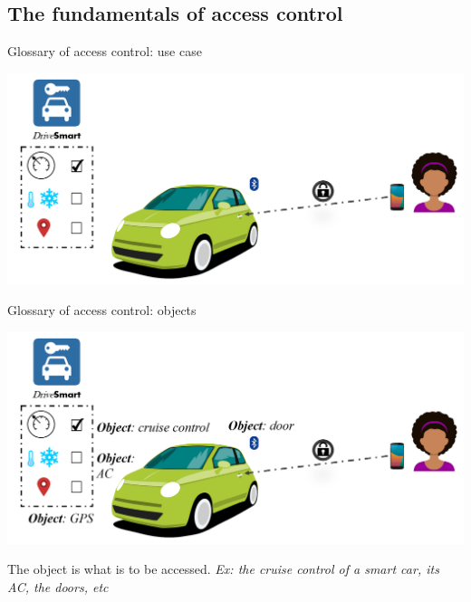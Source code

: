 \subsection{The fundamentals of access control}

\begin{frame}{Glossary of access control: use case}
    \begin{center}
        \includegraphics[scale=0.33]{Figures/ex_intro_1.png}
    \end{center}
\end{frame}

\begin{frame}{Glossary of access control: objects}
    \begin{center}
        \includegraphics[scale=0.33]{Figures/ex_intro_2.png}
    \end{center}
    
    \begin{definition}
        The \alert{object} is what is to be accessed. 
            \newline \emph{Ex: the cruise control of a smart car, its AC, the doors, etc}
    \end{definition}
\end{frame}

